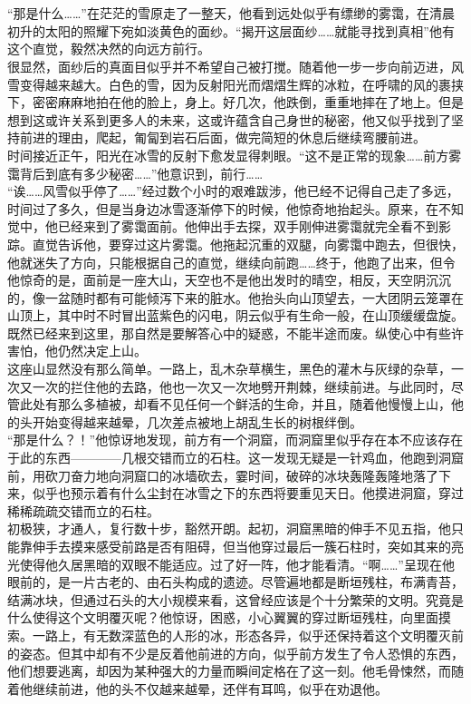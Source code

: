 \documentclass[a4paper]{article}
\begin{document}
	\section{}
		“那是什么……”在茫茫的雪原走了一整天，他看到远处似乎有缥缈的雾霭，在清晨初升的太阳的照耀下宛如淡黄色的面纱。“揭开这层面纱……就能寻找到真相”他有这个直觉，毅然决然的向远方前行。\\
		\indent 很显然，面纱后的真面目似乎并不希望自己被打搅。随着他一步一步向前迈进，风雪变得越来越大。白色的雪，因为反射阳光而熠熠生辉的冰粒，在呼啸的风的裹挟下，密密麻麻地拍在他的脸上，身上。好几次，他跌倒，重重地摔在了地上。但是想到这或许关系到更多人的未来，这或许蕴含自己身世的秘密，他又似乎找到了坚持前进的理由，爬起，匍匐到岩石后面，做完简短的休息后继续弯腰前进。\\
		\indent 时间接近正午，阳光在冰雪的反射下愈发显得刺眼。“这不是正常的现象……前方雾霭背后到底有多少秘密……”他意识到，前行……\\
		\indent “诶……风雪似乎停了……”经过数个小时的艰难跋涉，他已经不记得自己走了多远，时间过了多久，但是当身边冰雪逐渐停下的时候，他惊奇地抬起头。原来，在不知觉中，他已经来到了雾霭面前。他伸出手去探，双手刚伸进雾霭就完全看不到影踪。直觉告诉他，要穿过这片雾霭。他拖起沉重的双腿，向雾霭中跑去，但很快，他就迷失了方向，只能根据自己的直觉，继续向前跑……终于，他跑了出来，但令他惊奇的是，面前是一座大山，天空也不是他出发时的晴空，相反，天空阴沉沉的，像一盆随时都有可能倾泻下来的脏水。他抬头向山顶望去，一大团阴云笼罩在山顶上，其中时不时冒出蓝紫色的闪电，阴云似乎有生命一般，在山顶缓缓盘旋。既然已经来到这里，那自然是要解答心中的疑惑，不能半途而废。纵使心中有些许害怕，他仍然决定上山。\\
		\indent 这座山显然没有那么简单。一路上，乱木杂草横生，黑色的灌木与灰绿的杂草，一次又一次的拦住他的去路，他也一次又一次地劈开荆棘，继续前进。与此同时，尽管此处有那么多植被，却看不见任何一个鲜活的生命，并且，随着他慢慢上山，他的头开始变得越来越晕，几次差点被地上胡乱生长的树根绊倒。\\
		\indent “那是什么？！”他惊讶地发现，前方有一个洞窟，而洞窟里似乎存在本不应该存在于此的东西————几根交错而立的石柱。这一发现无疑是一针鸡血，他跑到洞窟前，用砍刀奋力地向洞窟口的冰墙砍去，霎时间，破碎的冰块轰隆轰隆地落了下来，似乎也预示着有什么尘封在冰雪之下的东西将要重见天日。他摸进洞窟，穿过稀稀疏疏交错而立的石柱。\\
		\indent 初极狭，才通人，复行数十步，豁然开朗。起初，洞窟黑暗的伸手不见五指，他只能靠伸手去摸来感受前路是否有阻碍，但当他穿过最后一簇石柱时，突如其来的亮光使得他久居黑暗的双眼不能适应。过了好一阵，他才能看清。“啊……”呈现在他眼前的，是一片古老的、由石头构成的遗迹。尽管遍地都是断垣残柱，布满青苔，结满冰块，但通过石头的大小规模来看，这曾经应该是个十分繁荣的文明。究竟是什么使得这个文明覆灭呢？他惊讶，困惑，小心翼翼的穿过断垣残柱，向里面摸索。一路上，有无数深蓝色的人形的冰，形态各异，似乎还保持着这个文明覆灭前的姿态。但其中却有不少是反着他前进的方向，似乎前方发生了令人恐惧的东西，他们想要逃离，却因为某种强大的力量而瞬间定格在了这一刻。他毛骨悚然，而随着他继续前进，他的头不仅越来越晕，还伴有耳鸣，似乎在劝退他。\\
\end{document}
